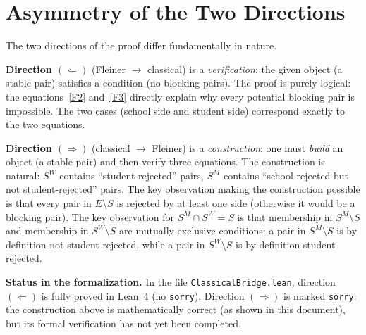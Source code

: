 \documentclass[12pt, a4paper]{article}
\theoremstyle{definition}
\theoremstyle{plain}
\theoremstyle{remark}
\newcommand{\SM}{S^M}
\newcommand{\SW}{S^W}
\begin{document}
\section{Asymmetry of the Two Directions}

The two directions of the proof differ fundamentally in nature.

\textbf{Direction $(\Leftarrow)$} (Fleiner $\to$ classical) is a
\emph{verification}: the given object (a stable pair) satisfies a condition
(no blocking pairs). The proof is purely logical: the equations~\eqref{F2}
and~\eqref{F3} directly explain why every potential blocking pair is impossible.
The two cases (school side and student side) correspond exactly to the two
equations.

\textbf{Direction $(\Rightarrow)$} (classical $\to$ Fleiner) is a
\emph{construction}: one must \emph{build} an object (a stable pair) and then
verify three equations. The construction is natural: $\SW$ contains
``student-rejected'' pairs, $\SM$ contains ``school-rejected but not
student-rejected'' pairs. The key observation making the construction possible
is that every pair in $E \setminus S$ is rejected by at least one side
(otherwise it would be a blocking pair). The key observation for
$\SM \cap \SW = S$ is that membership in $\SM \setminus S$ and membership in
$\SW \setminus S$ are mutually exclusive conditions: a pair in $\SM \setminus S$
is by definition not student-rejected, while a pair in $\SW \setminus S$ is by
definition student-rejected.

\textbf{Status in the formalization.}
In the file \texttt{ClassicalBridge.lean}, direction $(\Leftarrow)$ is fully
proved in Lean~4 (no \texttt{sorry}). Direction $(\Rightarrow)$ is marked
\texttt{sorry}: the construction above is mathematically correct (as shown in
this document), but its formal verification has not yet been completed.
\end{document}
